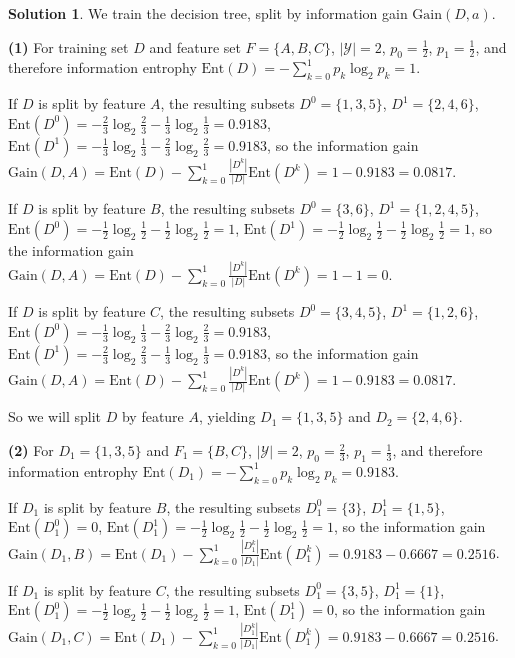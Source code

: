 \documentclass[a4paper,UTF8]{article}
\numberwithin{equation}{section}
\theoremstyle{definition}
\newtheorem*{solution}{Solution}
\begin{document}
\begin{solution}
We train the decision tree, split by information gain $\text{Gain}(D,a)$.

\textbf{(1)} For training set $D$ and feature set $F=\{A,B,C\}$, $|\mathcal{Y}|=2$, $p_0=\frac{1}{2}$, $p_1=\frac{1}{2}$, and therefore information entrophy $\text{Ent}(D)=-\sum_{k=0}^1p_k\log_2p_k=1$.

If $D$ is split by feature $A$, the resulting subsets $D^0=\{1,3,5\}$, $D^1=\{2,4,6\}$, $\text{Ent}(D^0)=-\frac{2}{3}\log_2\frac{2}{3}-\frac{1}{3}\log_2\frac{1}{3}=0.9183$, $\text{Ent}(D^1)=-\frac{1}{3}\log_2\frac{1}{3}-\frac{2}{3}\log_2\frac{2}{3}=0.9183$, so the information gain $\text{Gain}(D,A)=\text{Ent}(D)-\sum_{k=0}^1\frac{|D^{k}|}{|D|}\text{Ent}(D^{k})=1-0.9183=0.0817$.

If $D$ is split by feature $B$, the resulting subsets $D^0=\{3,6\}$, $D^1=\{1,2,4,5\}$, $\text{Ent}(D^0)=-\frac{1}{2}\log_2\frac{1}{2}-\frac{1}{2}\log_2\frac{1}{2}=1$, $\text{Ent}(D^1)=-\frac{1}{2}\log_2\frac{1}{2}-\frac{1}{2}\log_2\frac{1}{2}=1$, so the information gain $\text{Gain}(D,A)=\text{Ent}(D)-\sum_{k=0}^1\frac{|D^{k}|}{|D|}\text{Ent}(D^{k})=1-1=0$.

If $D$ is split by feature $C$, the resulting subsets $D^0=\{3,4,5\}$, $D^1=\{1,2,6\}$, $\text{Ent}(D^0)=-\frac{1}{3}\log_2\frac{1}{3}-\frac{2}{3}\log_2\frac{2}{3}=0.9183$, $\text{Ent}(D^1)=-\frac{2}{3}\log_2\frac{2}{3}-\frac{1}{3}\log_2\frac{1}{3}=0.9183$, so the information gain $\text{Gain}(D,A)=\text{Ent}(D)-\sum_{k=0}^1\frac{|D^{k}|}{|D|}\text{Ent}(D^{k})=1-0.9183=0.0817$.

So we will split $D$ by feature $A$, yielding $D_1=\{1,3,5\}$ and $D_2=\{2,4,6\}$.

\textbf{(2)} For $D_1=\{1,3,5\}$ and $F_1=\{B,C\}$, $|\mathcal{Y}|=2$, $p_0=\frac{2}{3}$, $p_1=\frac{1}{3}$, and therefore information entrophy $\text{Ent}(D_1)=-\sum_{k=0}^1p_k\log_2p_k=0.9183$.

If $D_1$ is split by feature $B$, the resulting subsets $D_1^0=\{3\}$, $D_1^1=\{1,5\}$, $\text{Ent}(D_1^0)=0$, $\text{Ent}(D_1^1)=-\frac{1}{2}\log_2\frac{1}{2}-\frac{1}{2}\log_2\frac{1}{2}=1$, so the information gain $\text{Gain}(D_1,B)=\text{Ent}(D_1)-\sum_{k=0}^1\frac{|D_1^{k}|}{|D_1|}\text{Ent}(D_1^{k})=0.9183-0.6667=0.2516$.

If $D_1$ is split by feature $C$, the resulting subsets $D_1^0=\{3,5\}$, $D_1^1=\{1\}$, $\text{Ent}(D_1^0)=-\frac{1}{2}\log_2\frac{1}{2}-\frac{1}{2}\log_2\frac{1}{2}=1$, $\text{Ent}(D_1^1)=0$, so the information gain $\text{Gain}(D_1,C)=\text{Ent}(D_1)-\sum_{k=0}^1\frac{|D_1^{k}|}{|D_1|}\text{Ent}(D_1^{k})=0.9183-0.6667=0.2516$.


\end{solution}
\end{document}
